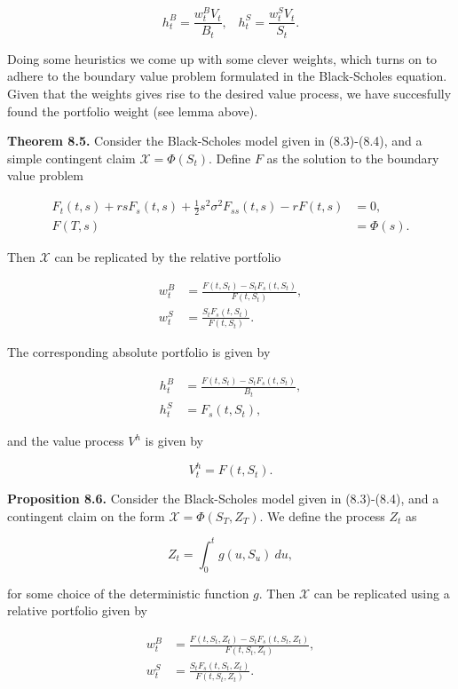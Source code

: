 \documentclass[
]{article}
\begin{document}
\[
h_t^B=\frac{w_t^B V_t}{B_t},\hspace{10pt} h_t^S=\frac{w_t^S V_t}{S_t}.
\]

Doing some heuristics we come up with some clever weights, which turns
on to adhere to the boundary value problem formulated in the
Black-Scholes equation. Given that the weights gives rise to the desired
value process, we have succesfully found the portfolio weight (see lemma
above).

\textbf{Theorem 8.5.} Consider the Black-Scholes model given in
(8.3)-(8.4), and a simple contingent claim \(\mathcal{X}=\Phi(S_t)\).
Define \(F\) as the solution to the boundary value problem

\begin{align*}
F_t(t,s)+rsF_s(t,s)+\frac{1}{2}s^2\sigma^2F_{ss}(t,s)-rF(t,s)&=0,\\
F(T,s)&=\Phi(s).
\end{align*}

Then \(\mathcal{X}\) can be replicated by the relative portfolio

\begin{align*}
w_t^B&=\frac{F(t,S_t)-S_tF_s(t,S_t)}{F(t,S_t)},\\
w_t^S&=\frac{S_tF_s(t,S_t)}{F(t,S_t)}.
\end{align*}

The corresponding absolute portfolio is given by

\begin{align*}
h_t^B&=\frac{F(t,S_t)-S_tF_s(t,S_t)}{B_t},\\
h_t^S&=F_s(t,S_t),
\end{align*}

and the value process \(V^h\) is given by

\[
V^h_t=F(t,S_t).
\]

\textbf{Proposition 8.6.} Consider the Black-Scholes model given in
(8.3)-(8.4), and a contingent claim on the form
\(\mathcal{X}=\Phi(S_T,Z_T)\). We define the process \(Z_t\) as

\[
Z_t=\int_0^tg(u,S_u)\ du,
\]

for some choice of the deterministic function \(g\). Then
\(\mathcal{X}\) can be replicated using a relative portfolio given by

\begin{align*}
w_t^B&=\frac{F(t,S_t,Z_t)-S_tF_s(t,S_t,Z_t)}{F(t,S_t,Z_t)},\\
w_t^S&=\frac{S_tF_s(t,S_t,Z_t)}{F(t,S_t,Z_t)}.
\end{align*}
\end{document}
